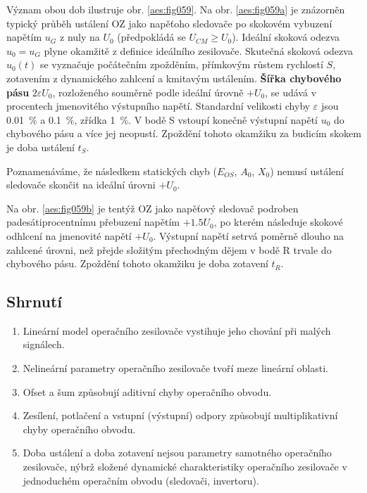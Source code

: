         Význam obou dob ilustruje obr. \ref{aes:fig059}. Na obr. \ref{aes:fig059a} je znázorněn
        typický průběh ustálení OZ jako napěťoho sledovače po skokovém vybuzení napětím \(u_G\) z
        nuly na \(U_0\) (předpokládá se \(U_{CM}\geq U_0\)). Ideální skoková odezva \(u_0 = u_G\)
        plyne okamžitě z definice ideálního zesilovače. Skutečná skoková odezva \(u_0(t)\) se
        vyznačuje počátečním zpožděním, přímkovým růstem rychlostí \(S\), zotavením z dynamického
        zahlcení a kmitavým ustálením. \textbf{Šířka chybového pásu} \(2\varepsilon U_0\),
        rozloženého souměrně podle ideální úrovně \(+U_0\), se udává v procentech jmenovitého
        výstupního napětí. Standardní velikosti chyby \(\varepsilon\) jsou \qty{0.01}{\percent} a
        \qty{0.1}{\percent}, zřídka \qty{1}{\percent}. V bodě S vstoupí konečně výstupní napětí
        \(u_0\) do chybového pásu a více jej neopustí. Zpoždění tohoto okamžiku za budicím skokem je
        doba ustálení \(t_S\).  

        Poznamenáváme, že následkem statických chyb (\(E_{OS}\), \(A_0\), \(X_0\)) nemusí ustálení
        sledovače skončit na ideální úrovni \(+U_0\).

        Na obr. \ref {aes:fig059b} je tentýž OZ jako napěťový sledovač podroben padesátiprocentnímu
        přebuzení napětím \(+\num{1.5}U_0\), po kterém následuje skokové odhlcení na jmenovité
        napětí \(+U_0\). Výstupní napětí setrvá poměrně dlouho na zahlcené úrovni, než přejde
        složitým přechodným dějem v bodě R trvale do chybového pásu. Zpoždění tohoto okamžiku je
        doba zotavení \(t_R\).
    
    \subsection{Shrnutí}\label{aesIchIIIsecIIssecIX}
      \begin{enumerate}[noitemsep]
        \item Lineární model operačního zesilovače vystihuje jeho chování při malých signálech. 
        \item Nelineární parametry operačního zesilovače tvoří meze lineární oblasti.
        \item Ofset a šum způsobují aditivní chyby operačního obvodu.
        \item Zesílení, potlačení a vstupní (výstupní) odpory způsobují multiplikativní
              chyby operačního obvodu.
        \item Doba ustálení a doba zotavení nejsou parametry samotného operačního zesilovače, nýbrž
              složené dynamické charakteristiky operačního zesilovače v jednoduchém operačním obvodu
              (sledovači, invertoru).           
      \end{enumerate}
      
